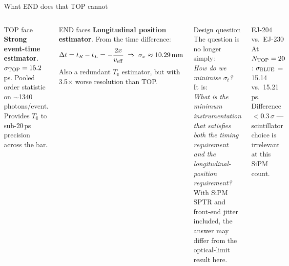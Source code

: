 \documentclass[aspectratio=169,9pt]{beamer}
\newcommand{\veff}{v_{\mathrm{eff}}}
\begin{document}
\begin{frame}{What END does that TOP cannot}
  \begin{columns}[T]
      \begin{block}{TOP face}
        {\small \textbf{Strong event-time estimator}.  $\sigma_{\rm TOP}=15.2$\,ps.
        Pooled order statistic on $\sim$1340 photons/event.
        Provides $T_0$ to sub-20\,ps precision across the bar.}
      \end{block}
      \begin{block}{END faces}
        {\small \textbf{Longitudinal position estimator}.  From the time difference:
        \[
          \Delta t = t_R - t_L = -\frac{2x}{\veff}
          \;\Rightarrow\;
          \sigma_x\approx\Napsigmaxendmm
        \]
        Also a redundant $T_0$ estimator, but with 3.5$\times$ worse resolution
        than TOP.}
      \end{block}
      \begin{alertblock}{Design question}
        {\small The question is no longer simply:\\
        \emph{How do we minimise $\sigma_t$?}\\[4pt]
        It is:\\
        \emph{What is the minimum instrumentation that satisfies
        both the timing requirement and the longitudinal-position requirement?}\\[4pt]
        With SiPM SPTR and front-end jitter included, the answer may differ
        from the optical-limit result here.}
      \end{alertblock}
      \begin{block}{EJ-204 vs.\ EJ-230}
        {\small At $N_{\rm TOP}=20$: $\sigma_{\rm BLUE}$ = 15.14 vs.\ 15.21\,ps.
        Difference $<$0.3\,$\sigma$ — scintillator choice is irrelevant at this SiPM count.}
      \end{block}
  \end{columns}
\end{frame}
\end{document}
